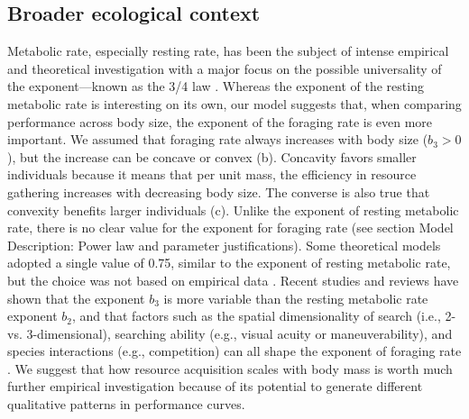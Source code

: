 \subsection*{Broader ecological context}
Metabolic rate, especially resting rate, has been the subject of intense empirical and theoretical investigation with a major focus on the possible universality of the exponent---known as the 3/4 law \citep{Peters1986,West1997, Kozlowski1997, Brown2004, Isaac2010}.
Whereas the exponent of the resting metabolic rate is interesting on its own, our model suggests that, when comparing performance across body size, the exponent of the foraging rate is even more important.
We assumed that foraging rate always increases with body size ($b_3 > 0$), but the increase can be concave or convex (b).
Concavity favors smaller individuals because it means that per unit mass, the efficiency in resource gathering increases with decreasing body size.
The converse is also true that convexity benefits larger individuals (c).
Unlike the exponent of resting metabolic rate, there is no clear value for the exponent for foraging rate (see section Model Description: Power law and parameter justifications). %
Some theoretical models adopted a single value of 0.75, similar to the exponent of resting metabolic rate, but the choice was not based on empirical data \citep{Yodzis1992, Brown1993}.
Recent studies and reviews have shown that the exponent $b_3$ is more variable than the resting metabolic rate exponent $b_2$, and that factors such as the spatial dimensionality of search (i.e., 2- vs. 3-dimensional), searching ability (e.g., visual acuity or maneuverability), and species interactions (e.g., competition) can all shape the exponent of foraging rate \citep{Pawar2012, Kalinkat2015}.
We suggest that how resource acquisition scales with body mass is worth much further empirical investigation because of its potential to generate different qualitative patterns in performance curves.


